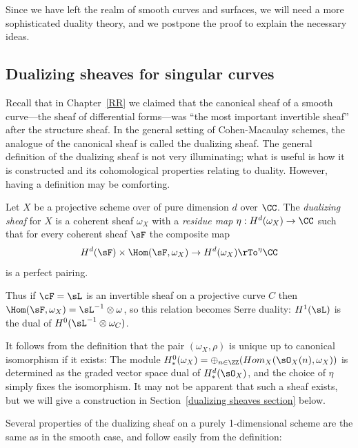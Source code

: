 Since we have left the realm of smooth curves and surfaces, we will need a more sophisticated duality theory, and we
postpone the proof to explain the necessary ideas.



\subsection{Dualizing sheaves for singular curves}\label{duality}

Recall that in Chapter~\ref{RR} we claimed that the canonical sheaf of a smooth curve---the sheaf of differential forms---was ``the most important invertible sheaf'' after the structure sheaf. In the general setting of Cohen-Macaulay schemes, the analogue of the canonical sheaf is called the dualizing sheaf.
The general definition of the dualizing sheaf is not very illuminating; what is useful is how it is constructed and its cohomological properties relating to duality.
However, having a definition may be comforting. 

\begin{definition}
Let $X$ be a projective scheme over of pure dimension $d$ over $\CC$. The \emph{dualizing sheaf} for $X$ is a coherent sheaf $\omega_X$ 
with a \emph{residue map} $\eta: H^d(\omega_X) \to \CC$ such that for every coherent sheaf  $\sF$ the composite map
$$
H^d(\sF) \times \Hom(\sF, \omega_X) \to H^d(\omega_X) \rTo^\eta \CC
$$
is a perfect pairing. 
\end{definition}

Thus if $\cF = \sL$ is an invertible sheaf on a projective curve $C$ then $\Hom(\sF, \omega_X) = \sL^{-1}\otimes \omega$,
so this relation becomes Serre duality: $H^{1}(\sL)$ is the dual of $H^{0}(\sL^{-1}\otimes \omega_{C})$.

It follows from the definition that the pair $(\omega_{X}, \rho)$ is unique up to canonical isomorphism if it exists:
The module $H^{0}_{*}(\omega_{X}) = \oplus_{n\in \ZZ}(Hom_{X}(\sO_{X}(n), \omega_{X}))$
is determined as the graded vector space dual of $H^{d}_{*}(\sO_{X})$, and the choice of $\eta$ simply fixes the isomorphism. It may not be apparent that such a sheaf exists, but we will give a construction in Section~\ref{dualizing sheaves section} below.
 
 Several properties of the dualizing sheaf on a purely 1-dimensional scheme
are the same as in the smooth case, and follow easily from the definition:

